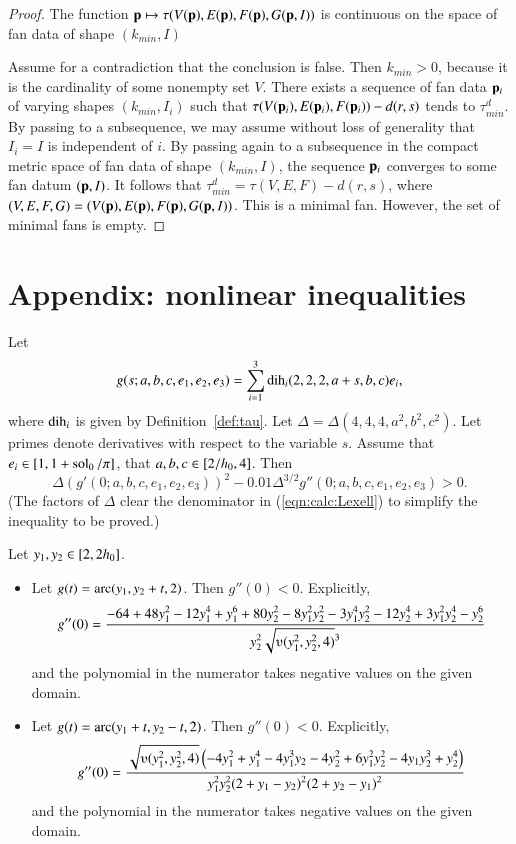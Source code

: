 \begin{proof} 
The function ${\mathbf p}\mapsto \tau(V({\mathbf p}),E({\mathbf p}),F({\mathbf p}),G({\mathbf p},I))$ is continuous on the space of fan data of shape $(k_{min},I)$

Assume for a contradiction that the conclusion is false.
Then $k_{min}>0$, because it is the cardinality of some nonempty set $V$.
There exists a sequence of fan data ${\mathbf p}_i$ of varying shapes $(k_{min},I_i)$ such that 
$\tau(V({\mathbf p}_i),E({\mathbf p}_i),F({\mathbf p}_i))-d(r,s)$ tends to $\tau^d_{min}$.  By passing to a subsequence, we may assume without loss of generality that $I_i = I$ is independent of $i$.
By passing again to a subsequence in the compact 
metric space of fan data of shape $(k_{min},I)$, the sequence ${\mathbf p}_i$ converges to some fan datum $({\mathbf p},I)$.
It follows that $\tau^d_{min} = \tau(V,E,F)-d(r,s)$, where $(V,E,F,G)=(V({\mathbf p}),E({\mathbf p}),F({\mathbf p}),G({\mathbf p},I))$.   
This is a minimal fan.
However, the set of minimal fans is empty.
\end{proof}


\section{Appendix: nonlinear inequalities}

\begin{calculation}\label{calc:Lexell}
Let
$$
g(s;a,b,c,e_1,e_2,e_3) = \sum_{i=1}^3 \operatorname{dih}_i(2,2,2,a+s,b,c) e_i,
$$
where $\operatorname{dih}_i$ is given by Definition~\ref{def:tau}.
Let $\Delta = \Delta(4,4,4,a^2,b^2,c^2)$.
Let primes denote derivatives with respect to the variable $s$.
Assume that
$e_i\in[1,1+\operatorname{sol}_0/\pi]$,  that
$a,b,c\in[2/{h_0},4]$.
Then
\begin{equation}\label{eqn:calc:Lexell}
\Delta (g'(0;a,b,c,e_1,e_2,e_3))^2 - 0.01\Delta^{3/2}g''(0;a,b,c,e_1,e_2,e_3) > 0.
\end{equation}
(The factors of $\Delta$ clear the denominator in (\ref{eqn:calc:Lexell}) to
simplify the inequality to be proved.)
\end{calculation}

\begin{calculation}\label{calc:2der}
Let $y_1,y_2\in [ 2,2{h_0}]$.  
\begin{itemize}
\item 
Let $g(t) = \operatorname{arc}(y_1,y_2+t,2)$.  Then $g''(0) < 0$.
Explicitly,
$$
g''(0) = \dfrac{
-64 + 48y_1^2 - 12 y_1^4 + y_1^6 + 80 y_2^2 - 8 y_1^2 y_2^2 - 3 y_1^4 y_2^2
 - 12 y_2 ^4 + 3 y_1^2 y_2^4 - y_2^6
}{y_2^2 \sqrt{\ups(y_1^2,y_2^2,4)}^3}
$$
and the polynomial in the numerator takes negative values on the given domain.
\item
Let $g(t) = \operatorname{arc}(y_1+t,y_2-t,2)$.  Then $g''(0) < 0$.
Explicitly,
$$
g''(0) = \dfrac{\sqrt{\ups(y_1^2,y_2^2,4)} \left(
-4 y_1^2 + y_1^4 - 4y_1^3 y_2 - 4y_2^2 + 6 y_1^2 y_2^2 - 4 y_1 y_2^3 +y_2^4
\right)}{y_1^2 y_2^2 (2+y_1-y_2)^2 (2+y_2-y_1)^2}
$$
and the polynomial in the numerator takes negative values on the given domain.
\end{itemize}
\end{calculation}

